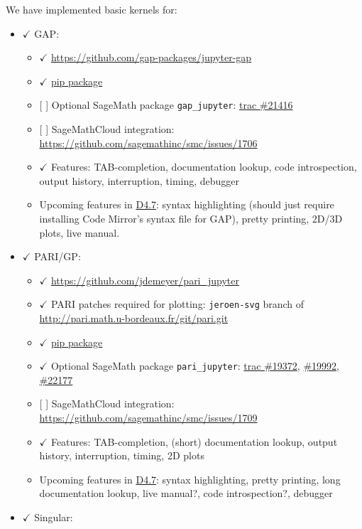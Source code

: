 We have implemented basic kernels for:

\begin{itemize}
\tightlist
\item
  \(\checkmark\) GAP:

  \begin{itemize}
  \tightlist
  \item
    \(\checkmark\) \url{https://github.com/gap-packages/jupyter-gap}
  \item
    \(\checkmark\)
    \href{https://pypi.python.org/pypi/jupyter-kernel-gap}{pip package}
  \item
    {[} {]} Optional SageMath package \texttt{gap\_jupyter}:
    \href{https://trac.sagemath.org/ticket/21416}{trac \#21416}
  \item
    {[} {]} SageMathCloud integration:
    \url{https://github.com/sagemathinc/smc/issues/1706}
  \item
    \(\checkmark\) Features: TAB-completion, documentation lookup, code
    introspection, output history, interruption, timing, debugger
  \item
    Upcoming features in
    \href{https://github.com/OpenDreamKit/OpenDreamKit/issues/96}{D4.7}:
    syntax highlighting (should just require installing Code Mirror's
    syntax file for GAP), pretty printing, 2D/3D plots, live manual.
  \end{itemize}
\item
  \(\checkmark\) PARI/GP:

  \begin{itemize}
  \tightlist
  \item
    \(\checkmark\) \url{https://github.com/jdemeyer/pari_jupyter}
  \item
    \(\checkmark\) PARI patches required for plotting:
    \texttt{jeroen-svg} branch of
    \url{http://pari.math.u-bordeaux.fr/git/pari.git}
  \item
    \(\checkmark\) \href{https://pypi.python.org/pypi/pari_jupyter}{pip
    package}
  \item
    \(\checkmark\) Optional SageMath package \texttt{pari\_jupyter}:
    \href{https://trac.sagemath.org/ticket/19372}{trac \#19372},
    \href{https://trac.sagemath.org/ticket/19992}{\#19992},
    \href{https://trac.sagemath.org/ticket/22177}{\#22177}
  \item
    {[} {]} SageMathCloud integration:
    \url{https://github.com/sagemathinc/smc/issues/1709}
  \item
    \(\checkmark\) Features: TAB-completion, (short) documentation
    lookup, output history, interruption, timing, 2D plots
  \item
    Upcoming features in
    \href{https://github.com/OpenDreamKit/OpenDreamKit/issues/96}{D4.7}:
    syntax highlighting, pretty printing, long documentation lookup,
    live manual?, code introspection?, debugger
  \end{itemize}
\item
  \(\checkmark\) Singular:


\end{itemize}
